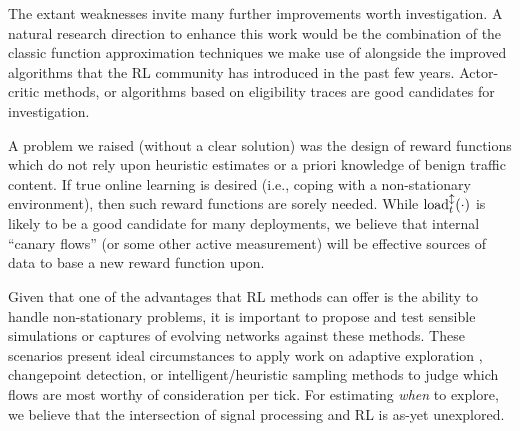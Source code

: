 \documentclass[conference, a4paper, 10pt, times]{IEEEtran}
\begin{document}
The extant weaknesses invite many further improvements worth investigation.
A natural research direction to enhance this work would be the combination of the classic function approximation techniques we make use of alongside the improved algorithms that the RL community has introduced in the past few years.
Actor-critic methods, or algorithms based on eligibility traces are good candidates for investigation. 

A problem we raised (without a clear solution) was the design of reward functions which do not rely upon heuristic estimates or a priori knowledge of benign traffic content.
If true online learning is desired (i.e., coping with a non-stationary environment), then such reward functions are sorely needed.
While $\operatorname{load}^{\updownarrow}_{t}(\cdot)$ is likely to be a good candidate for many deployments, we believe that internal ``canary flows'' (or some other active measurement) will be effective sources of data to base a new reward function upon.

Given that one of the advantages that RL methods can offer is the ability to handle non-stationary problems, it is important to propose and test sensible simulations or captures of evolving networks against these methods.
These scenarios present ideal circumstances to apply work on adaptive exploration \cite{DBLP:conf/ki/Tokic10, DBLP:conf/ki/TokicP11, DBLP:conf/annpr/TokicP12}, changepoint detection, or intelligent/heuristic sampling methods to judge which flows are most worthy of consideration per tick.
For estimating \emph{when} to explore, we believe that the intersection of signal processing and RL is as-yet unexplored.
\end{document}
